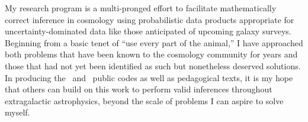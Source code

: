 
My research program is a multi-pronged effort to facilitate mathematically correct inference in cosmology using probabilistic data products appropriate for uncertainty-dominated data like those anticipated of upcoming galaxy surveys.
Beginning from a basic tenet of ``use every part of the animal,'' I have approached both problems that have been known to the cosmology community for years and those that had not yet been identified as such but nonetheless deserved solutions.
In producing the \qp\ and \chippr\ public codes as well as pedagogical texts, it is my hope that others can build on this work to perform valid inferences throughout extragalactic astrophysics, beyond the scale of problems I can aspire to solve myself.

